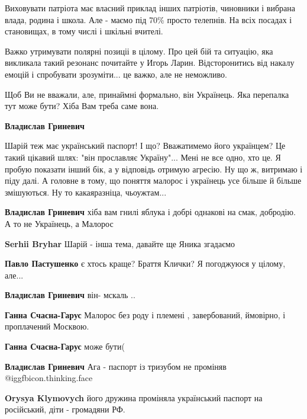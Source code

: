 \begin{itemize}
\begin{itemize}
Виховувати патріота має власний приклад інших патріотів, чиновники і вибрана
влада, родина і школа. Але - маємо під 70\% просто телепнів. На всіх посадах і
становищах, в тому числі і шкільні вчителі.

\end{itemize} %


Важко утримувати полярні позиціі в цілому. Про цей бій та ситуацію, яка
викликала такий резонанс почитайте у Игорь Ларин. Відсторонитись від накалу
емоцій і спробувати зрозуміти... це важко, але не неможливо.


Щоб Ви не вважали, але, принаймні формально, він Українець. Яка перепалка тут
може бути? Хіба Вам треба саме вона.

\begin{itemize} %
\textbf{Владислав Гриневич} 

Шарій теж має український паспорт! І що? Вважатимемо його українцем? Це такий
цікавий шлях: "він прославляє Україну"... Мені не все одно, хто це. Я пробую
показати інший бік, а у відповідь отримую агресію. Ну що ж, витримаю і піду
далі. А головне в тому, що поняття малорос і українець усе більше й більше
змішуються. Ну то какаяразніца, чьоужтам...


\textbf{Владислав Гриневич} хіба вам гнилі яблука і добрі однакові на смак, добродію. А то не Українець, а Малорос

\textbf{Serhii Bryhar} Шарій - інша тема, давайте ще Яника згадаємо

\textbf{Павло Пастушенко} є хтось краще? Браття Клички?
Я погоджуюся у цілому, але...

\textbf{Владислав Гриневич} він- мскаль
..

\textbf{Ганна Счасна-Гарус} Малорос без роду і племені , завербований, ймовірно, і проплачений Москвою.

\textbf{Ганна Счасна-Гарус} може бути(
\end{itemize} %

\textbf{Владислав Гриневич}
Ага - паспорт із тризубом не проміняв  @igg{fbicon.thinking.face} 

\begin{itemize} %
\textbf{Orysya Klymovych} його дружина проміняла український паспорт на російський, діти - громадяни РФ.


\end{itemize}
\end{itemize}
